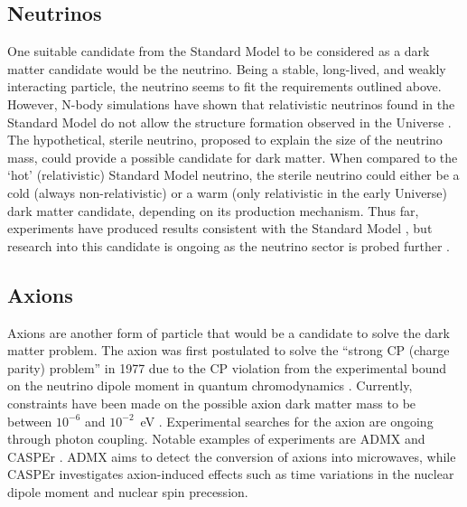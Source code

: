 \subsection{Neutrinos}\label{sec:DMOverview/Neutrinos}
One suitable candidate from the Standard Model to be considered as a dark matter candidate would be the neutrino. Being a stable, long-lived, and weakly interacting particle, the neutrino seems to fit the requirements outlined above. However, N-body simulations have shown that relativistic neutrinos found in the Standard Model do not allow the structure formation observed in the Universe \cite{White:1983fcs}. 
The hypothetical, sterile neutrino, proposed to explain the size of the neutrino mass, could provide a possible candidate for dark matter. When compared to the `hot' (relativistic) Standard Model neutrino, the sterile neutrino could either be a cold (always non-relativistic) or a warm (only relativistic in the early Universe) dark matter candidate, depending on its production mechanism. Thus far, experiments have produced results consistent with the Standard Model \cite{Boyarsky:2018tvu}, but research into this candidate is ongoing as the neutrino sector is probed further \cite{Krasnov:2019kdc}.


\subsection{Axions}\label{sec:DMOverview/Axions}
Axions are another form of particle that would be a candidate to solve the dark matter problem. The axion was first postulated to solve the ``strong CP (charge parity) problem'' in 1977 \cite{ConsvCP} due to the CP violation from the experimental bound on the neutrino dipole moment in quantum chromodynamics \cite{Hook:2018dlk}. Currently, constraints have been made on the possible axion dark matter mass to be between $10^{-6}$ and $10^{-2}$~eV \cite{Duffy:2009ig}. Experimental searches for the axion are ongoing through photon coupling. Notable examples of experiments are ADMX \cite{ADMX:2018gho} and CASPEr \cite{JacksonKimball:2017elr}. ADMX aims to detect the conversion of axions into microwaves, while CASPEr investigates axion-induced effects such as time variations in the nuclear dipole moment and nuclear spin precession.


